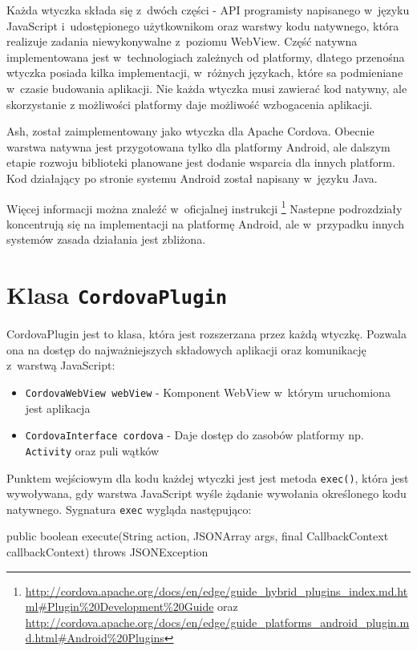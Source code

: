 \documentclass[brudnopis]{xmgr}
\begin{document}
Każda wtyczka składa się z~dwóch części - API programisty napisanego w~języku JavaScript i~udostępionego użytkownikom oraz warstwy kodu natywnego, która realizuje zadania niewykonywalne z~poziomu WebView. Część natywna implementowana jest w~technologiach zależnych od platformy, dlatego przenośna wtyczka posiada kilka implementacji, w~różnych językach, które sa podmieniane w~czasie budowania aplikacji. Nie każda wtyczka musi zawierać kod natywny, ale skorzystanie z możliwości platformy daje możliwość wzbogacenia aplikacji.

Ash, został zaimplementowany jako wtyczka dla Apache Cordova. Obecnie warstwa natywna jest przygotowana tylko dla platformy Android, ale dalszym etapie rozwoju biblioteki planowane jest dodanie wsparcia dla innych platform. Kod działający po stronie systemu Android został napisany w~języku Java.

Więcej informacji można znaleźć w~oficjalnej instrukcji
\footnote{
  \url{http://cordova.apache.org/docs/en/edge/guide\_hybrid\_plugins\_index.md.html\#Plugin\%20Development\%20Guide}  
  oraz 
  \url{http://cordova.apache.org/docs/en/edge/guide\_platforms\_android\_plugin.md.html\#Android\%20Plugins}   
}
Nastepne podrozdziały koncentrują się na implementacji na platformę Android, ale w~przypadku innych systemów zasada działania jest zbliżona.

\section{Klasa \texttt{CordovaPlugin} }

CordovaPlugin jest to klasa, która jest rozszerzana przez każdą wtyczkę. Pozwala ona na dostęp do najważniejszych składowych aplikacji oraz komunikację z~warstwą JavaScript: 

\begin{itemize}
  \item \texttt{CordovaWebView webView} - Komponent WebView w~którym uruchomiona jest aplikacja
  \item \texttt{CordovaInterface cordova} - Daje dostęp do zasobów platformy np. \texttt{Activity} oraz puli wątków
\end{itemize}

Punktem wejściowym dla kodu każdej wtyczki jest jest metoda \texttt{exec()}, która jest wywoływana, gdy warstwa JavaScript wyśle żądanie wywołania określonego kodu natywnego. Sygnatura \texttt{exec} wygląda następująco:

\begin{javacode}
public boolean execute(String action, 
                       JSONArray args, 
                       final CallbackContext callbackContext) 
                       throws JSONException
\end{javacode}
\end{document}
